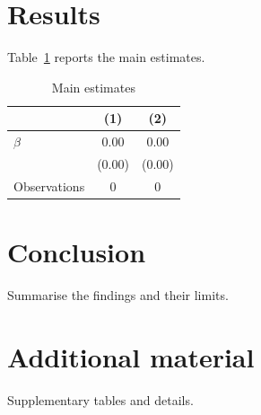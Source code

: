 \documentclass[12pt]{article}
\begin{document}
\section{Results}\label{sec:results}

Table~\ref{tab:main} reports the main estimates.

\begin{table}[htbp]
\centering
\caption{Main estimates}\label{tab:main}
\begin{tabular}{lcc}
\toprule
 & (1) & (2) \\
\midrule
$\beta$ & 0.00 & 0.00 \\
 & (0.00) & (0.00) \\
\midrule
Observations & 0 & 0 \\
\bottomrule
\end{tabular}
\end{table}

\section{Conclusion}\label{sec:conclusion}

Summarise the findings and their limits.




\appendix
\section{Additional material}\label{app:extra}

Supplementary tables and details.
\end{document}
